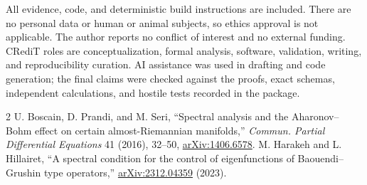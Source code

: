 \documentclass[10pt]{article}
\begin{document}
All evidence, code, and deterministic build instructions are included.
There are no personal data or human or animal subjects, so ethics approval
is not applicable.  The author reports no conflict of interest and no
external funding.  CRediT roles are conceptualization, formal analysis,
software, validation, writing, and reproducibility curation.  AI assistance
was used in drafting and code generation; the final claims were checked
against the proofs, exact schemas, independent calculations, and hostile
tests recorded in the package.
\fi

\begin{thebibliography}{2}
U. Boscain, D. Prandi, and M. Seri,
``Spectral analysis and the Aharonov--Bohm effect on certain
almost-Riemannian manifolds,''
\emph{Commun. Partial Differential Equations} 41 (2016), 32--50,
\href{https://arxiv.org/abs/1406.6578}{arXiv:1406.6578}.
M. Harakeh and L. Hillairet,
``A spectral condition for the control of eigenfunctions of
Baouendi--Grushin type operators,''
\href{https://arxiv.org/abs/2312.04359}{arXiv:2312.04359} (2023).
\end{thebibliography}
\end{document}
